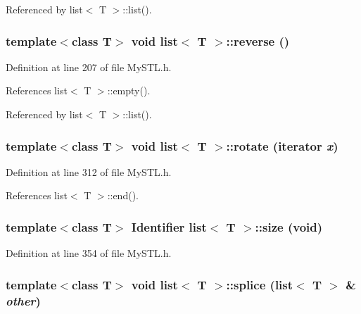 Referenced by list$<$ T $>$::list().

\subsubsection[{reverse}]{\setlength{\rightskip}{0pt plus 5cm}template$<$class T$>$ void {\bf list}$<$ T $>$::reverse ()}\label{classlist_a676f28528dea1df100910363d903ad90}


Definition at line 207 of file MySTL.h.



References list$<$ T $>$::empty().



Referenced by list$<$ T $>$::list().

\subsubsection[{rotate}]{\setlength{\rightskip}{0pt plus 5cm}template$<$class T$>$ void {\bf list}$<$ T $>$::rotate ({\bf iterator} {\em x})}\label{classlist_a94b7f31cf58cd41726b36006a96c6bb6}


Definition at line 312 of file MySTL.h.



References list$<$ T $>$::end().

\subsubsection[{size}]{\setlength{\rightskip}{0pt plus 5cm}template$<$class T$>$ {\bf Identifier} {\bf list}$<$ T $>$::size (void)}\label{classlist_a2e3e44a048e07d3dd6dc814695ed64b8}


Definition at line 354 of file MySTL.h.

\subsubsection[{splice}]{\setlength{\rightskip}{0pt plus 5cm}template$<$class T$>$ void {\bf list}$<$ T $>$::splice ({\bf list}$<$ T $>$ \& {\em other})}\label{classlist_acfa94cc4bde517b8bb5e61727262bf6f}


